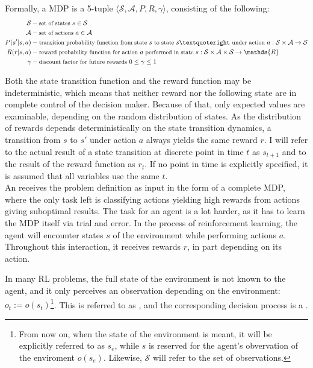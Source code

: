 \noindent Formally, a MDP is a 5-tuple $\langle \mathcal{S}, \mathcal{A}, P, R, \gamma \rangle$, consisting of the following:\\
\begin{align*}
\mathcal{S} &- \text{\small set of states } s\in \mathcal{S}\\
\mathcal{A} &- \text{\small set of actions } a \in \mathcal{A}\\
P(s'|s, a) &- \text{\small transition probability function from state } s \text{\small ~to state } s’ \text{\small ~under action } a: \mathcal{S} \times \mathcal{A} \rightarrow \mathcal{S} \\
R(r|s, a) &- \text{\small reward probability function for action } a \text{\small ~performed in state } s: \mathcal{S} \times \mathcal{A} \times \mathcal{S} \rightarrow \mathds{R} \\
\gamma &- \text{\small discount factor for future rewards } 0 \leq \gamma \leq 1
\end{align*}

\noindent Both the state transition function and the reward function may be indeterministic, which means that neither reward nor the following state are in complete control of the decision maker. Because of that, only expected values are examinable, depending on the random distribution of states. As the distribution of rewards depends deterministically on the state transition dynamics, a transition from $s$ to $s'$ under action $a$ always yields the same reward $r$. I will refer to the actual result of a state transition at discrete point in time $t$ as $s_{t+1}$ and to the result of the reward function as $r_t$. If no point in time is explicitly specified, it is assumed that all variables use the same $t$.\\

\noindent An  receives the problem definition as input in the form of a complete MDP, where the only task left is classifying actions yielding high rewards from actions giving suboptimal results. The task for an  agent is a lot harder, as it has to learn the MDP itself via trial and error. In the process of reinforcement learning, the agent will encounter states $s$ of the environment while performing actions $a$. Throughout this interaction, it receives rewards $r$, in part depending on its action.

In many RL problems, the full state of the environment is not known to the agent, and it only perceives an observation depending on the environment: $o_t := o(s_t)$\footnote{From now on, when the state of the environment is meant, it will be explicitly referred to as $s_e$, while $s$ is reserved for the agent's obvervation of the enviroment $o(s_e)$. Likewise, $\mathcal{S}$ will refer to the set of observations.}. This is referred to as , and the corresponding decision process is a . 


